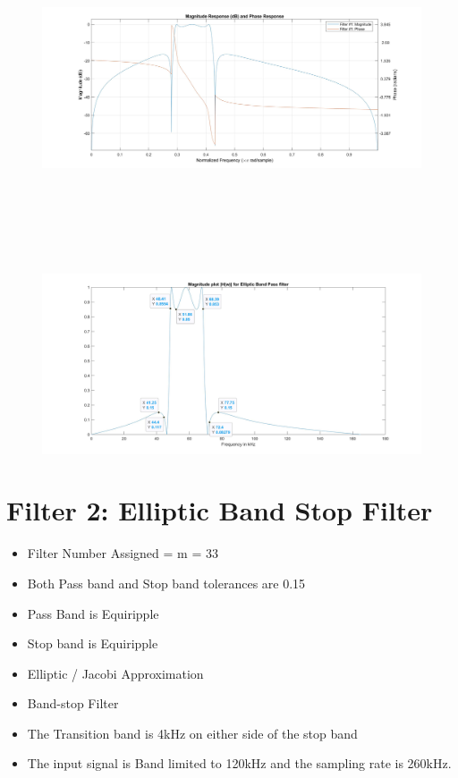 \documentclass[12pt]{article}
\begin{document}
\begin{figure}[H]
	\centering
	\includegraphics[width = 18cm, height = 10cm]{Filter3MagPhase.jpg}
\end{figure}
\begin{figure}[H]
	\centering
	\includegraphics[width = 18cm, trim=0cm 0cm 0cm 0cm, clip]{Filter3DBPF.jpg}
\end{figure}



\color{darkblue}
\section{Filter 2: Elliptic Band Stop Filter}
\color{black}
\begin{itemize}
	\item Filter Number Assigned = m = 33
	\item Both Pass band and Stop band tolerances are 0.15
	\item Pass Band is Equiripple 
	\item Stop band is Equiripple 
	\item Elliptic / Jacobi Approximation
	\item Band-stop Filter
	\item The Transition band is 4kHz on either side of the stop band
	\item The input signal is Band limited to 120kHz and the sampling rate is 260kHz.
\end{itemize}
\color{cyan}
\end{document}
